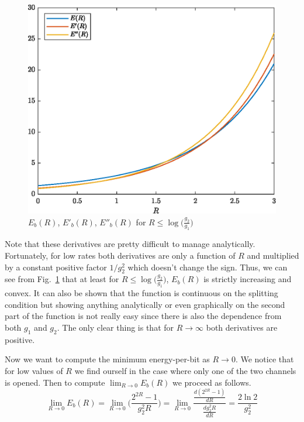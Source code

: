 \begin{figure}[t]
	\centering
	\includegraphics[width=0.7\linewidth]{img/energy_per_bit_1.eps}
	\caption{$E_b(R)$, $E'_b(R)$, $E''_b(R)$ for $R \leq \log\Big(\frac{g_2}{g_1}\Big)$ }
	\label{fig:funcex2}
\end{figure}

Note that these derivatives are pretty difficult to manage analytically. Fortunately, for low rates both derivatives are only a function of $R$ and multiplied by a constant positive factor $1/g_2^2$ which doesn't change the sign. Thus, we can see from Fig.~\ref{fig:funcex2} that at least for $R \leq \log\Big(\frac{g_2}{g_1}\Big)$, $E_b(R)$ is strictly increasing and convex. It can also be shown that the function is continuous on the splitting condition but showing anything analytically or even graphically on the second part of the function is not really easy since there is also the dependence from both $g_1$ and $g_2$. The only clear thing is that for $R \rightarrow \infty$ both derivatives are positive.

Now we want to compute the minimum energy-per-bit as $R \rightarrow 0$. We notice that for low values of $R$ we find ourself in the case where only one of the two channels is opened. Then to compute $\lim_{R \rightarrow 0} E_b(R)$ we proceed as follows.
%
\begin{equation}
	\lim_{R \rightarrow 0} E_b(R) =
		\lim_{R \rightarrow 0} \Big(\frac{2^{2R}-1}{g_2^2 R}\Big) = \lim_{R \rightarrow 0} \frac{ \frac{d(2^{2R}-1)}{dR}} {\frac{dg_2^2 R}{dR}}=\frac{2\ln{2}}{g_2^2}
		\label{emin}
\end{equation}

